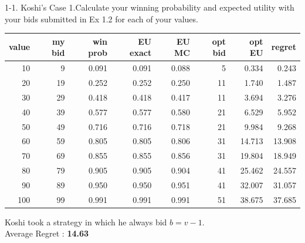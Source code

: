 \documentclass{beamer}
\begin{document}
\begin{frame}{1-1. Koshi's Case}
1.Calculate your winning probability and expected utility with your bids submitted in Ex 1.2 for each of your values.
\begin{center}
\small
\begin{tabular}{@{}rrrrrrrr@{}}
\toprule
value & my bid & win prob & EU exact & EU MC & opt bid & opt EU & regret \\
\midrule
 10 &   9 & 0.091 & 0.091 & 0.088 &  5 & 0.334 & 0.243 \\
 20 &  19 & 0.252 & 0.252 & 0.250 & 11 & 1.740 & 1.487 \\
 30 &  29 & 0.418 & 0.418 & 0.417 & 11 & 3.694 & 3.276 \\
 40 &  39 & 0.577 & 0.577 & 0.580 & 21 & 6.529 & 5.952 \\
 50 &  49 & 0.716 & 0.716 & 0.718 & 21 & 9.984 & 9.268 \\
 60 &  59 & 0.805 & 0.805 & 0.806 & 31 &14.713 &13.908 \\
 70 &  69 & 0.855 & 0.855 & 0.856 & 31 &19.804 &18.949 \\
 80 &  79 & 0.905 & 0.905 & 0.904 & 41 &25.462 &24.557 \\
 90 &  89 & 0.950 & 0.950 & 0.951 & 41 &32.007 &31.057 \\
100 &  99 & 0.991 & 0.991 & 0.991 & 51 &38.675 &37.685 \\
\bottomrule
\end{tabular}
\end{center}
Koshi took a strategy in which he always bid \(b=v-1\).\\
Average Regret : \textbf{14.63}
\end{frame}
\end{document}
